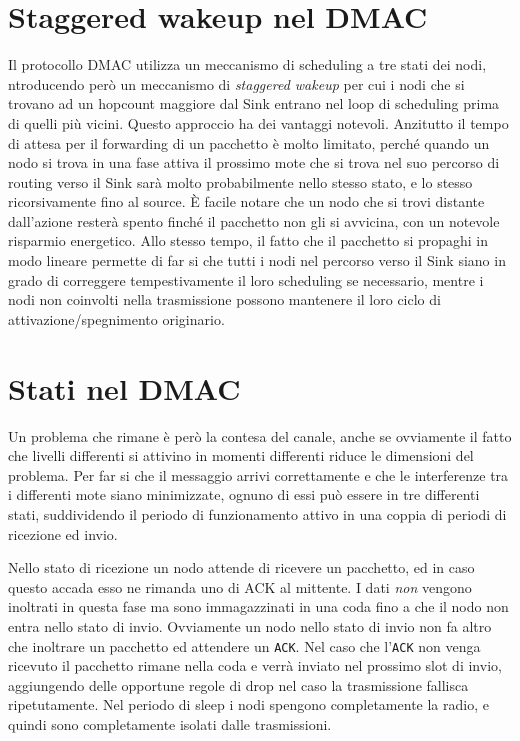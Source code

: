 \documentclass[pdftex,12pt,a4paper,italian,openany]{book}
\begin{document}
\section{Staggered wakeup nel DMAC}
Il protocollo DMAC utilizza un meccanismo di scheduling a tre stati dei nodi, 
ntroducendo però un meccanismo di \emph{staggered wakeup} per cui i nodi che si trovano ad un 
hopcount maggiore dal Sink entrano nel loop di scheduling prima di quelli più vicini.
Questo approccio ha dei vantaggi notevoli. Anzitutto il tempo di attesa per il forwarding di un pacchetto è molto limitato, perché quando un nodo si trova in una fase attiva il prossimo mote 
che si trova nel suo percorso di routing verso il Sink sarà molto probabilmente nello stesso 
stato, e lo stesso ricorsivamente fino al source. 
\`E facile notare che un nodo che si trovi distante dall'azione resterà spento finché il 
pacchetto non gli si avvicina, con un notevole risparmio energetico.
Allo stesso tempo, il fatto che il pacchetto si propaghi in modo lineare permette di far si che 
tutti i nodi nel percorso verso il Sink siano in grado di correggere tempestivamente il loro 
scheduling se necessario, mentre i nodi non coinvolti nella trasmissione possono mantenere il 
loro ciclo di attivazione/spegnimento originario. 


\section{Stati nel DMAC}
Un problema che rimane è però la contesa del canale, anche se ovviamente il fatto che livelli 
differenti si attivino in momenti differenti riduce le dimensioni del problema.
Per far si che il messaggio arrivi correttamente e che le interferenze tra i differenti 
mote siano minimizzate, ognuno di essi può essere in tre differenti stati, suddividendo il 
periodo di funzionamento attivo in una coppia di periodi di ricezione ed invio. 

Nello stato di ricezione un nodo attende di ricevere un pacchetto, ed in caso questo accada 
esso ne rimanda uno di ACK al mittente. I dati \emph{non} vengono inoltrati in questa fase ma 
sono immagazzinati in una coda fino a che il nodo non entra nello stato di invio.
Ovviamente un nodo nello stato di invio non fa altro che inoltrare un pacchetto ed attendere un 
\texttt{ACK}. Nel caso che l'\texttt{ACK}  non venga ricevuto il pacchetto rimane nella coda e 
verrà inviato nel prossimo slot di invio, aggiungendo delle opportune regole di drop nel caso 
la trasmissione fallisca ripetutamente. 
Nel periodo di sleep i nodi spengono completamente la radio, e quindi sono completamente isolati dalle trasmissioni. 
\end{document}
